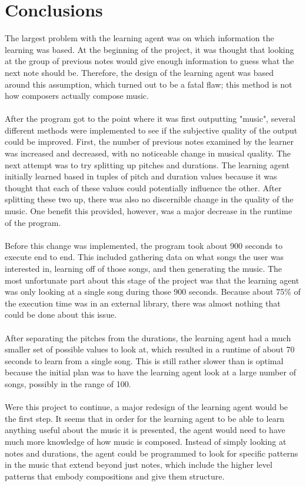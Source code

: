 \documentclass{article}
\begin{document}
\section{Conclusions}
The largest problem with the learning agent was on which information the learning was based.  At the beginning of the project, it was thought that looking at the group of previous notes would give enough information to guess what the next note should be. Therefore, the design of the learning agent was based around this assumption, which turned out to be a fatal flaw; this method is not how composers actually compose music.\\
\\
After the program got to the point where it was first outputting "music", several different methods were implemented to see if the subjective quality of the output could be improved. First, the number of previous notes examined by the learner was increased and decreased, with no noticeable change in musical quality. The next attempt was to try splitting up pitches and durations. The learning agent initially learned based in tuples of pitch and duration values because it was thought that each of these values could potentially influence the other. After splitting these two up, there was also no discernible change in the quality of the music. One benefit this provided, however, was a major decrease in the runtime of the program.\\
\\
Before this change was implemented, the program took about 900 seconds to execute end to end. This included gathering data on what songs the user was interested in, learning off of those songs, and then generating the music. The most unfortunate part about this stage of the project was that the learning agent was only looking at a single song during those 900 seconds. Because about 75\% of the execution time was in an external library, there was almost nothing that could be done about this issue.\\
\\
After separating the pitches from the durations, the learning agent had a much smaller set of possible values to look at, which resulted in a runtime of about 70 seconds to learn from a single song. This is still rather slower than is optimal because the initial plan was to have the learning agent look at a large number of songs, possibly in the range of 100.\\
\\
Were this project to continue, a major redesign of the learning agent would be the first step. It seems that in order for the learning agent to be able to learn anything useful about the music it is presented, the agent would need to have much more knowledge of how music is composed. Instead of simply looking at notes and durations, the agent could be programmed to look for specific patterns in the music that extend beyond just notes, which include the higher level patterns that embody compositions and give them structure.\\
\end{document}
